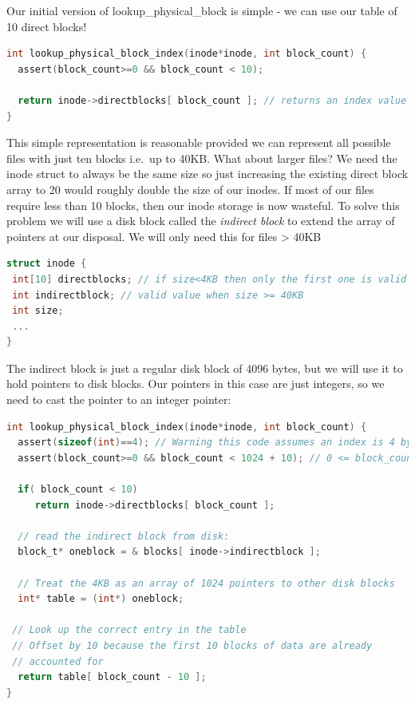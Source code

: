 Our initial version of lookup\_physical\_block is simple - we can use our table of 10 direct blocks!

\begin{lstlisting}[language=C]
int lookup_physical_block_index(inode*inode, int block_count) {
  assert(block_count>=0 && block_count < 10);

  return inode->directblocks[ block_count ]; // returns an index value between [0,MAX_BLOCK)
}
\end{lstlisting}

This simple representation is reasonable provided we can represent all possible files with just ten blocks i.e.~up to 40KB. What about larger files? We need the inode struct to always be the same size so just increasing the existing direct block array to 20 would roughly double the size of our inodes. If most of our files require less than 10 blocks, then our inode storage is now wasteful. To solve this problem we will use a disk block called the \emph{indirect block} to extend the array of pointers at our disposal. We will only need this for files \textgreater{} 40KB

\begin{lstlisting}[language=C]
struct inode {
 int[10] directblocks; // if size<4KB then only the first one is valid
 int indirectblock; // valid value when size >= 40KB
 int size;
 ...
}
\end{lstlisting}

The indirect block is just a regular disk block of 4096 bytes, but we will use it to hold pointers to disk blocks. Our pointers in this case are just integers, so we need to cast the pointer to an integer pointer:

\begin{lstlisting}[language=C]
int lookup_physical_block_index(inode*inode, int block_count) {
  assert(sizeof(int)==4); // Warning this code assumes an index is 4 bytes!
  assert(block_count>=0 && block_count < 1024 + 10); // 0 <= block_count< 1034

  if( block_count < 10)
     return inode->directblocks[ block_count ];
  
  // read the indirect block from disk:
  block_t* oneblock = & blocks[ inode->indirectblock ];

  // Treat the 4KB as an array of 1024 pointers to other disk blocks
  int* table = (int*) oneblock;
  
 // Look up the correct entry in the table
 // Offset by 10 because the first 10 blocks of data are already 
 // accounted for
  return table[ block_count - 10 ];
}
\end{lstlisting}

